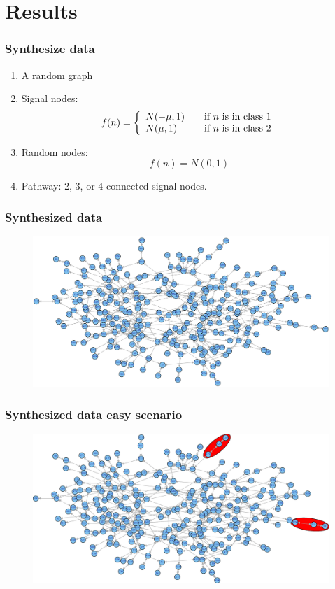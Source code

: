 \documentclass{beamer}
\begin{document}
\section{Results}
\begin{frame}
\frametitle{Synthesize data}
\begin{enumerate}
\item A random graph
\item Signal nodes: \[ f(n) = \left\{ 
  \begin{array}{l l}
    N(-\mu, 1) & \quad \text{if $n$ is in class $1$}\\
    N(\mu, 1) & \quad \text{if $n$ is in class $2$}
  \end{array} \right.\]
\item Random nodes: \[f(n) = N(0, 1) \]
\item Pathway: 2, 3, or 4 connected signal nodes.
\end{enumerate}
\end{frame}

\begin{frame}[plain]
\frametitle{Synthesized data}
\begin{figure}
\includegraphics[scale=0.25]{synthesized-graph} 
\end{figure}
\end{frame}

\begin{frame}[plain]
\frametitle{Synthesized data easy scenario}
\begin{figure}
\includegraphics[scale=0.25]{synthesized-graph-easy} 
\end{figure}
\end{frame}
\end{document}
